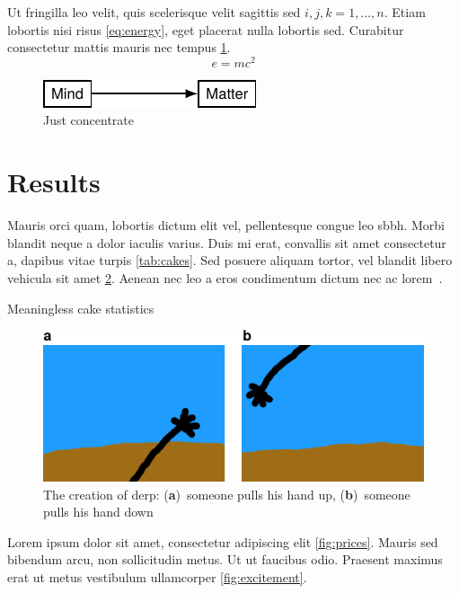 \documentclass[12pt]{article}
\begin{document}
Ut fringilla leo velit, quis scelerisque velit sagittis sed \( i,j,k=1,\dotsc,n \). Etiam lobortis nisi risus \cref{eq:energy}, eget placerat nulla lobortis sed. Curabitur consectetur mattis mauris nec tempus \cref{fig:mind-to-matter}.
%
\begin{equation}\label{eq:energy}
	e = m c^2
\end{equation}

\begin{figure}
	\centering
	\includegraphics{mind-to-matter}
	\caption{Just concentrate}%
	\label{fig:mind-to-matter}
\end{figure}

\section{Results}

Mauris orci quam, lobortis dictum elit vel, pellentesque congue leo \gls{sbbh}. Morbi blandit neque a dolor iaculis varius. Duis mi erat, convallis sit amet consectetur a, dapibus vitae turpis \cref{tab:cakes}. Sed posuere aliquam tortor, vel blandit libero vehicula sit amet \cref{fig:adam}. Aenean nec leo a eros condimentum dictum nec ac lorem~\autocite{Einstein1935,Hawking1975}.

\begin{table}
	\centering
	\caption{Meaningless cake statistics}%
	\label{tab:cakes}
\end{table}

\begin{figure}
	\centering
	\includegraphics{adam}
	\caption{The creation of derp: (\textbf{a})~someone pulls his hand up, (\textbf{b})~someone pulls his hand down}%
	\label{fig:adam}
\end{figure}

Lorem ipsum dolor sit amet, consectetur adipiscing elit \cref{fig:prices}. Mauris sed bibendum arcu, non sollicitudin metus. Ut ut faucibus odio. Praesent maximus erat ut metus vestibulum ullamcorper \cref{fig:excitement}.
\end{document}

